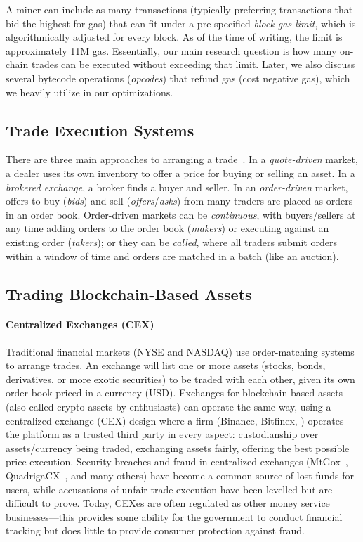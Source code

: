 A miner can include as many transactions (typically preferring transactions that bid the highest for gas) that can fit under a pre-specified \textit{block gas limit}, which is algorithmically adjusted for every block. As of the time of writing, the limit is approximately 11M gas. Essentially, our main research question is how many on-chain trades can be executed without exceeding that limit. Later, we also discuss several bytecode operations (\emph{opcodes}) that refund gas (\ie cost negative gas), which we heavily utilize in our optimizations.

\subsection{Trade Execution Systems}

There are three main approaches to arranging a trade~\cite{Har03}. In a \emph{quote-driven} market, a dealer uses its own inventory to offer a price for buying or selling an asset. In a \emph{brokered exchange}, a broker finds a buyer and seller. In an \emph{order-driven} market, offers to buy (\emph{bids}) and sell (\emph{offers}/\emph{asks}) from many traders are placed as orders in an order book. Order-driven markets can be \emph{continuous}, with buyers/sellers at any time adding orders to the order book (\emph{makers}) or executing against an existing order (\emph{takers}); or they can be \emph{called}, where all traders submit orders within a window of time and orders are matched in a batch (like an auction). 

\subsection{Trading Blockchain-Based Assets}

%

\paragraph[Centralized Exchanges (CEX)]{Centralized Exchanges (CEX)\eatpunct} Traditional financial markets (\eg NYSE and NASDAQ) use order-matching systems to arrange trades. An exchange will list one or more assets (stocks, bonds, derivatives, or more exotic securities) to be traded with each other, given its own order book priced in a currency (\eg USD). Exchanges for blockchain-based assets (also called crypto assets by enthusiasts) can operate the same way, using a centralized exchange (CEX) design where a firm (\eg Binance, Bitfinex, \etc) operates the platform as a trusted third party in every aspect: custodianship over assets/currency being traded, exchanging assets fairly, offering the best possible price execution. Security breaches and fraud in centralized exchanges  (\eg MtGox~\cite{TheHisto45:online}, QuadrigaCX~\cite{SEBIOrde83:online}, and many others) have become a common source of lost funds for users, while accusations of unfair trade execution have been levelled but are difficult to prove. Today, CEXes are often regulated as other money service businesses---this provides some ability for the government to conduct financial tracking but does little to provide consumer protection against fraud. 

